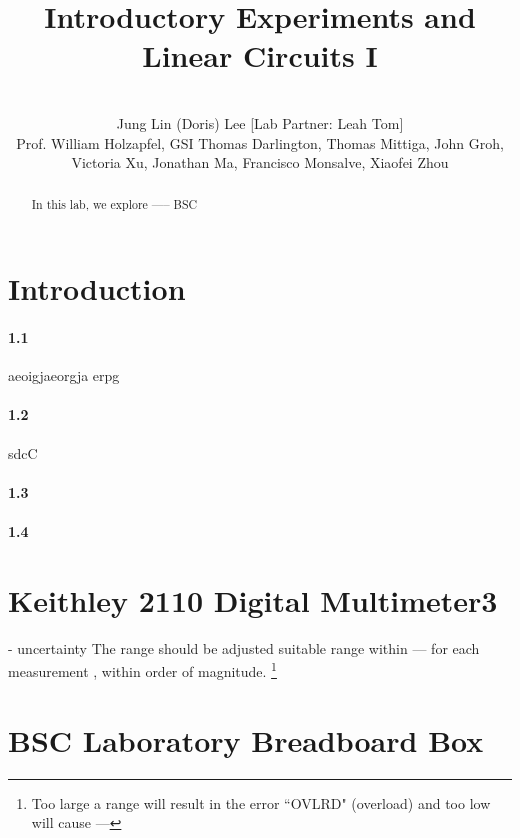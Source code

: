 \documentclass[10pt,letterpaper,oneside] {article}
\begin{document}
\title{Introductory Experiments and Linear Circuits I}
\author{\quad \\Jung Lin (Doris) Lee [Lab Partner: Leah Tom]\\Prof. William Holzapfel, GSI Thomas Darlington, Thomas Mittiga, John Groh,  \\Victoria Xu, Jonathan Ma, Francisco Monsalve, Xiaofei Zhou}
\maketitle
	\begin{abstract}
	In this lab, we explore ----- BSC 
	\end{abstract}


\section{Introduction}
 
 
\paragraph{\textbf{1.1}}
 aeoigjaeorgja erpg 
 
\paragraph{\textbf{1.2}} 
sdcC
 
\paragraph{\textbf{1.3}} 
 
\paragraph{\textbf{1.4}} 
   
 \section{Keithley 2110 Digital Multimeter3}
- uncertainty
The range should be adjusted  suitable range within --- for each measurement , within order of magnitude. \footnote{Too large a range will result in the error ``OVLRD" (overload) and too low will cause ---}
\section{BSC Laboratory Breadboard Box}
\end{document}

